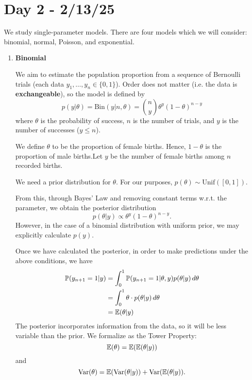 \documentclass{chaistyle}
\begin{document}
\section*{Day 2 - 2/13/25}
We study single-parameter models. There are four models which we will consider: binomial, normal, Poisson, and exponential.
\begin{enumerate}[1.]
    \item \textbf{Binomial}
    
    We aim to estimate the population proportion from a sequence of Bernoulli trials (each data \(y_1,\dots,y_n\in\{0,1\}\)). Order does not matter (i.e. the data is \textbf{exchangeable}), so the model is defined by \[p(y|\theta)=\text{Bin}(y|n,\theta)=\binom{n}{y}\theta^y(1-\theta)^{n-y}\] where \(\theta\) is the probability of success, \(n\) is the number of trials, and \(y\) is the number of successes (\(y\leq n\)).
    \vspace{3mm}
    \begin{example*}

        We define \(\theta\) to be the proportion of female births. Hence, \(1-\theta\) is the proportion of male births.Let \(y\) be the number of female births among \(n\) recorded births.

        We need a prior distribution for \(\theta.\) For our purposes, \(p(\theta)\sim\text{Unif}([0,1]).\)

        From this, through Bayes' Law and removing constant terms w.r.t. the parameter, we obtain the posterior distribution \[p(\theta|y)\propto\theta^y(1-\theta)^{n-y}.\] However, in the case of a binomial distribution with uniform prior, we may explicitly calculate \(p(y).\)

        Once we have calculated the posterior, in order to make predictions under the above conditions, we have \begin{align*}
            \mathbb{P}(y_{n+1}=1|y) &= \int_{0}^{1}\mathbb{P}(y_{n+1}=1|\theta,y)p(\theta|y)\,d\theta \\ 
            &= \int_{0}^{1}\theta\cdot p(\theta|y)\,d\theta \\ 
            &= \mathbb{E}(\theta|y) \\ 
        \end{align*}
        The posterior incorporates information from the data, so it will be less variable than the prior. We formalize as the Tower Property: \[\mathbb{E}(\theta)=\mathbb{E}(\mathbb{E}(\theta|y))\] and \[\text{Var}(\theta)=\mathbb{E}(\text{Var}(\theta|y)) + \text{Var}(\mathbb{E}(\theta|y)).\]


\end{example*}
\end{enumerate}
\end{document}
